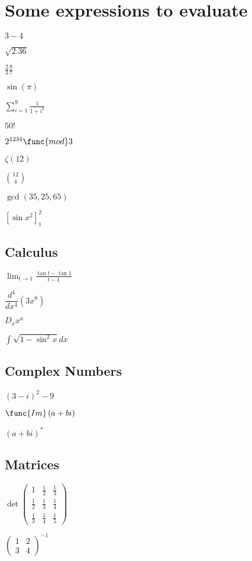 \documentclass{article}
\begin{document}
\section{Some expressions to evaluate}

$3-4$

$\sqrt{2.36}$

$\frac{2}{3}\frac{8}{7}$

$\sin \left( \pi \right) $

$\sum_{i=1}^{9}\frac{1}{1+i^{2}}$

$50!$

$2^{1234}\func{mod}3$

$\zeta \left( 12\right) $

$\binom{12}{4}$

$\gcd \left( 35,25,65\right) $

$\left[ \sin x^{2}\right] _{1}^{2}$

\subsection{Calculus}

$\lim_{t\rightarrow 1}\frac{\tan t-\tan 1}{t-1}$

$\dfrac{d^{4}}{dx^{4}}\left( 3x^{8}\right) $

$D_{x}x^{a}$

$\int \sqrt{1-\sin ^{2}x}dx$

\subsection{Complex Numbers}

$\left( 3-i\right) ^{2}-9$

$\func{Im}\left( a+bi\right) $

$\left( a+bi\right) ^{\ast }$

\subsection{Matrices}

$\det \left( 
\begin{array}{ccc}
1 & \frac{1}{2} & \frac{1}{3} \\ 
\frac{1}{2} & \frac{1}{3} & \frac{1}{4} \\ 
\frac{1}{3} & \frac{1}{4} & \frac{1}{5}%
\end{array}%
\right) $

$\left( 
\begin{array}{cc}
1 & 2 \\ 
3 & 4%
\end{array}%
\right) ^{-1}$
\end{document}
